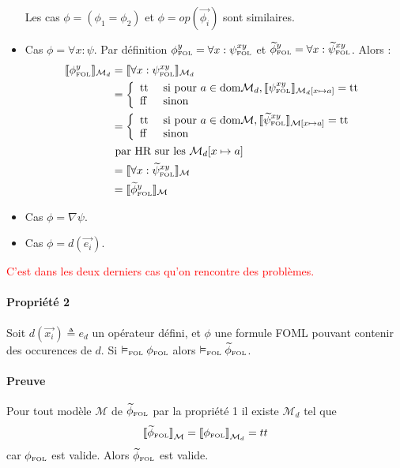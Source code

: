 \documentclass[12pt]{article}
\newcommand{\FOL}{\ensuremath{\textup{\tiny{}FOL}}}
\newcommand{\false}{\textup{ff}}
\newcommand{\true}{\textup{tt}}
\newcommand{\M}{\ensuremath{\mathcal{M}}}
\newcommand{\raph}[1]{\textcolor{red}{#1}}
\begin{document}
\begin{itemize}
  Les cas $\phi = (\phi_1 = \phi_2)$ et $\phi = op(\vec{\phi_i})$ sont similaires.
\item
  Cas $\phi = \forall x : \psi$.
  Par définition $\phi_\FOL^y = \forall x : {\psi}_\FOL^{xy}$ et $\widetilde{\phi}_\FOL^y = \forall x : \widetilde{\psi}_\FOL^{xy}$.
  Alors :
  \begin{align*}
    \llbracket \phi_\FOL^y \rrbracket_{\mathcal{M}_d}
    &= \llbracket \forall x : \psi_\FOL^{xy} \rrbracket_{\mathcal{M}_d} \\
    &= \left \{
      \begin{array}{l l}
        \true & \textup{ si pour } a \in \textup{dom} \mathcal{M}_d, \llbracket \psi_\FOL^{xy} \rrbracket_{\mathcal{M}_d[x \mapsto a]} = \true \\
        \false & \textup{ sinon }
      \end{array}
                 \right . \\
    &= \left \{
      \begin{array}{l l}
        \true & \textup{ si pour } a \in \textup{dom} \mathcal{M}, \llbracket \widetilde{\psi}_\FOL^{xy} \rrbracket_{\mathcal{M}[x \mapsto a]} = \true \\
        \false & \textup{ sinon }
      \end{array}
                 \right . \\
    & \textup{ par HR sur les } \M_d[x \mapsto a] \\
    &= \llbracket \forall x : \widetilde{\psi}_\FOL^{xy} \rrbracket_{\mathcal{M}} \\
    &= \llbracket \widetilde{\phi}_\FOL^y \rrbracket_{\mathcal{M}}
  \end{align*}

\item
  Cas $\phi = \nabla \psi$.
\item
  Cas $\phi = d(\vec{e_i})$.
\end{itemize}

\raph{%
  C'est dans les deux derniers cas qu'on rencontre des problèmes.}



\paragraph{Propriété 2}
Soit $d(\vec{x_i}) \triangleq e_d$ un opérateur défini, et $\phi$ une formule FOML pouvant contenir des occurences de $d$.
Si $\vDash_\FOL \phi_\FOL$ alors $\vDash_\FOL \widetilde{\phi}_\FOL$.

\paragraph{Preuve}
Pour tout modèle $\mathcal{M}$ de $\widetilde{\phi}_\FOL$ par la propriété 1 il existe $\mathcal{M}_d$ tel que
\[
  {\llbracket \widetilde{\phi}_\FOL \rrbracket}_{\mathcal{M}} = {\llbracket \phi_\FOL \rrbracket}_{\mathcal{M}_d} = tt
\]
car $\phi_\FOL$ est valide. Alors $\widetilde{\phi}_\FOL$ est valide.
\end{document}
